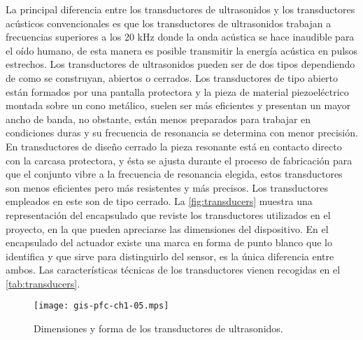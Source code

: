 La principal diferencia entre los transductores de ultrasonidos y los
transductores acústicos convencionales es que los transductores de
ultrasonidos trabajan a frecuencias superiores a los 20 kHz donde la onda
acústica se hace inaudible para el oído humano, de esta manera es posible
transmitir la energía acústica en pulsos estrechos. Los transductores de
ultrasonidos pueden ser de dos tipos dependiendo de como se construyan,
abiertos o cerrados. Los transductores de tipo abierto están formados por
una pantalla protectora y la pieza de material piezoeléctrico montada sobre
un cono metálico, suelen ser más eficientes y presentan un mayor ancho de
banda, no obstante, están menos preparados para trabajar en condiciones
duras y su frecuencia de resonancia se determina con menor precisión. En
transductores de diseño cerrado la pieza resonante está en contacto directo
con la carcasa protectora, y ésta se ajusta durante el proceso de
fabricación para que el conjunto vibre a la frecuencia de resonancia
elegida, estos transductores son menos eficientes pero más resistentes y
más precisos. Los transductores empleados en este  son de tipo
cerrado. La \vref{fig:transducers} muestra una representación del
encapsulado que reviste los transductores utilizados en el proyecto, en la
que pueden apreciarse las dimensiones del dispositivo. En el encapsulado
del actuador existe una marca en forma de punto blanco que lo identifica y
que sirve para distinguirlo del sensor, es la única diferencia entre ambos.
Las características técnicas de los transductores vienen recogidas en el
\cref{tab:transducers}.

\begin{figure}
	\begin{center}
		\texttt{[image: gis-pfc-ch1-05.mps]}
	\end{center}
	\caption[Dimensiones de los transductores de
	ultrasonidos]{Dimensiones y forma de los transductores de
	ultrasonidos.}
	\label{fig:transducers}
\end{figure}


